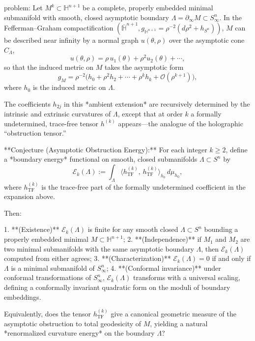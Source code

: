 problem:  
Let \(M^k \subset \mathbb{H}^{n+1}\) be a complete, properly embedded minimal submanifold with smooth, closed asymptotic boundary \(\Lambda = \partial_\infty M \subset S^n_\infty\).  
In the Fefferman–Graham compactification \((\bar{\mathbb{H}}^{n+1}, g_{\mathbb{H}^{n+1}} = \rho^{-2}(d\rho^2 + h_{S^n}))\), \(M\) can be described near infinity by a normal graph \(u(\theta,\rho)\) over the asymptotic cone \(C_\Lambda\)\!,
\[
u(\theta,\rho) = \rho\, u_1(\theta) + \rho^2 u_2(\theta) + \cdots,
\]
so that the induced metric on \(M\) takes the asymptotic form
\[
g_M = \rho^{-2}\big(h_0 + \rho^2 h_2 + \cdots + \rho^k h_k + \mathcal{O}(\rho^{k+1})\big),
\]
where \(h_0\) is the induced metric on \(\Lambda\).

The coefficients \(h_{2j}\) in this *ambient extension* are recursively determined by the intrinsic and extrinsic curvatures of \(\Lambda\), except that at order \(k\) a formally undetermined, trace-free tensor \(h^{(k)}\) appears—the analogue of the holographic “obstruction tensor.”

**Conjecture (Asymptotic Obstruction Energy):**  
For each integer \(k\ge2\), define a *boundary energy* functional on smooth, closed submanifolds \(\Lambda \subset S^n\) by
\[
\mathcal{E}_k(\Lambda) := \int_{\Lambda} \!\! \langle h^{(k)}_{\text{TF}},\, h^{(k)}_{\text{TF}} \rangle_{h_0} \, d\mu_{h_0},
\]
where \(h^{(k)}_{\text{TF}}\) is the trace-free part of the formally undetermined coefficient in the expansion above.

Then:

1. **(Existence)** \(\mathcal{E}_k(\Lambda)\) is finite for any smooth closed \(\Lambda\subset S^n\) bounding a properly embedded minimal \(M\subset \mathbb{H}^{n+1}\);  
2. **(Independence)** if \(M_1\) and \(M_2\) are two minimal submanifolds with the same asymptotic boundary \(\Lambda\), then \(\mathcal{E}_k(\Lambda)\) computed from either agrees;  
3. **(Characterization)** \(\mathcal{E}_k(\Lambda) = 0\) if and only if \(\Lambda\) is a minimal submanifold of \(S^n_\infty\);  
4. **(Conformal invariance)** under conformal transformations of \(S^n_\infty\), \(\mathcal{E}_k(\Lambda)\) transforms with a universal scaling, defining a conformally invariant quadratic form on the moduli of boundary embeddings.

Equivalently, does the tensor \(h^{(k)}_{\text{TF}}\) give a canonical geometric measure of the asymptotic obstruction to total geodesicity of \(M\), yielding a natural *renormalized curvature energy* on the boundary \(\Lambda\)?

